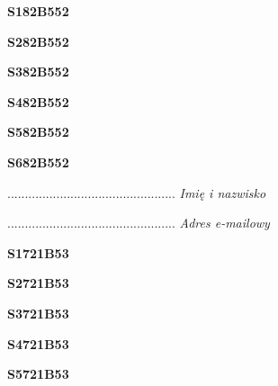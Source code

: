 \begin{turn}{90}\huge \textbf{S182B552}\end{turn}

\begin{turn}{90}\huge \textbf{S282B552}\end{turn}

\begin{turn}{90}\huge \textbf{S382B552}\end{turn}

\begin{turn}{90}\huge \textbf{S482B552}\end{turn}

\begin{turn}{90}\huge \textbf{S582B552}\end{turn}

\begin{turn}{90}\huge \textbf{S682B552}\end{turn}

\begin{turn}{90}\begin{minipage}{\linewidth} \vspace{20mm} ................................................  \textit{Imię i nazwisko}\end{minipage}\end{turn}

\begin{turn}{90}\begin{minipage}{\linewidth} \vspace{20mm} ................................................  \textit{Adres e-mailowy}\end{minipage}\end{turn}

\begin{turn}{90}\huge \textbf{S1721B53}\end{turn}

\begin{turn}{90}\huge \textbf{S2721B53}\end{turn}

\begin{turn}{90}\huge \textbf{S3721B53}\end{turn}

\begin{turn}{90}\huge \textbf{S4721B53}\end{turn}

\begin{turn}{90}\huge \textbf{S5721B53}\end{turn}

